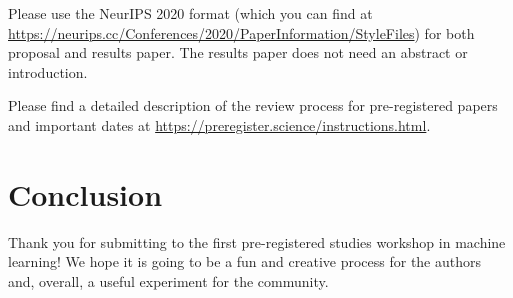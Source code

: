 \documentclass{article}
\begin{document}

Please use the NeurIPS 2020 format (which you can find at \url{https://neurips.cc/Conferences/2020/PaperInformation/StyleFiles}) for both proposal and results paper.
The results paper does not need an abstract or introduction.

Please find a detailed description of the review process for pre-registered papers and important dates at \url{https://preregister.science/instructions.html}.

\section{Conclusion}
Thank you for submitting to the first pre-registered studies workshop in machine learning!
We hope it is going to be a fun and creative process for the authors and, overall, a useful experiment for the community.


{\small

}
\end{document}
